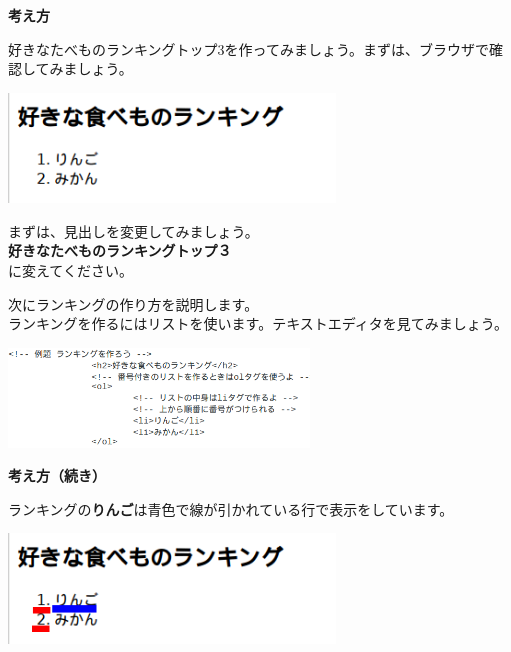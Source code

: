 \documentclass[a4paper,12pt]{jarticle}
\begin{document}
\bigskip


\bigskip

\textbf{考え方}



\bigskip



好きなたべものランキングトップ3を作ってみましょう。まずは、ブラウザで確認してみましょう。


\bigskip

\includegraphics[width=0.65\textwidth]{textbook-img179.png}

\bigskip

まずは、見出しを変更してみましょう。\\
\textbf{好きなたべものランキングトップ３}\\
に変えてください。


\bigskip

次にランキングの作り方を説明します。\\
ランキングを作るにはリストを使います。テキストエディタを見てみましょう。

\centering
\includegraphics[width=0.6\textwidth]{textbook-img180.png}

\clearpage
\flushleft
\textbf{考え方（続き）}


\bigskip


ランキングの\textbf{りんご}は青色で線が引かれている行で表示をしています。


\bigskip


\includegraphics[width=0.65\textwidth]{textbook-img182.png}


\bigskip
\end{document}
